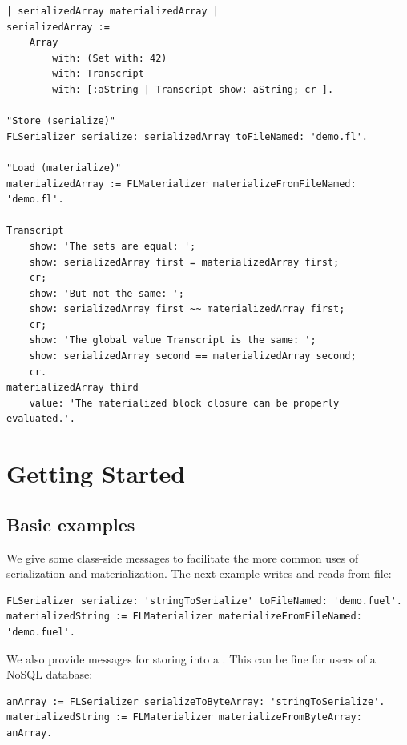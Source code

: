 \documentclass[a4paper,10pt,twoside]{book}
\begin{document}
\begin{lstlisting}
| serializedArray materializedArray |
serializedArray := 
    Array 
        with: (Set with: 42)
        with: Transcript
        with: [:aString | Transcript show: aString; cr ].

"Store (serialize)"
FLSerializer serialize: serializedArray toFileNamed: 'demo.fl'. 

"Load (materialize)"
materializedArray := FLMaterializer materializeFromFileNamed: 'demo.fl'. 

Transcript
	show: 'The sets are equal: ';
	show: serializedArray first = materializedArray first;
	cr;
	show: 'But not the same: ';
	show: serializedArray first ~~ materializedArray first;
	cr;
	show: 'The global value Transcript is the same: ';
	show: serializedArray second == materializedArray second;
	cr.
materializedArray third 
	value: 'The materialized block closure can be properly evaluated.'.
\end{lstlisting}




\section{Getting Started}

\label{GettingStarted}

\subsection{Basic examples}

We give some class-side messages to facilitate the more common uses of serialization and materialization. The next example writes and reads from file:

\begin{lstlisting}
FLSerializer serialize: 'stringToSerialize' toFileNamed: 'demo.fuel'. 
materializedString := FLMaterializer materializeFromFileNamed: 'demo.fuel'.
\end{lstlisting}

We also provide messages for storing into a . This can be fine for users of a NoSQL database:

\begin{lstlisting}
anArray := FLSerializer serializeToByteArray: 'stringToSerialize'. 
materializedString := FLMaterializer materializeFromByteArray: anArray.
\end{lstlisting}
\end{document}
